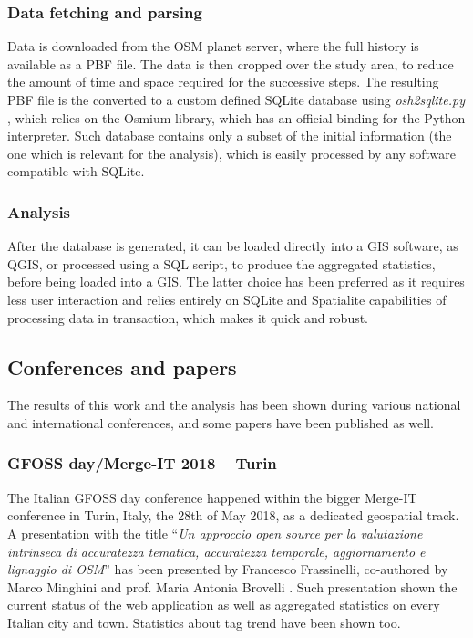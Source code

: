 \documentclass{Configuration_Files/PoliMi3i_thesis}
\begin{document}
\subsubsection{Data fetching and parsing}

Data is downloaded from the OSM planet server, where the full history is available as a PBF file. The data is then cropped over the study area, to reduce the amount of time and space required for the successive steps. The resulting PBF file is the converted to a custom defined SQLite database using \textit{osh2sqlite.py} \cite{262588213843476OSMNodeHistory}, which relies on the Osmium library, which has an official binding for the Python interpreter. Such database contains only a subset of the initial information (the one which is relevant for the analysis), which is easily processed by any software compatible with SQLite.

\subsubsection{Analysis}

After the database is generated, it can be loaded directly into a GIS software, as QGIS, or processed using a SQL script, to produce the aggregated statistics, before being loaded into a GIS. The latter choice has been preferred \cite{262588213843476ProcessingDatabasesGenerated}as it requires less user interaction and relies entirely on SQLite and Spatialite capabilities of processing data in transaction, which makes it quick and robust.

\subsection{Conferences and papers}

The results of this work and the analysis has been shown during various national and international conferences, and some papers have been published as well.

\subsubsection{GFOSS day/Merge-IT 2018 – Turin}

The Italian GFOSS day conference happened within the bigger Merge-IT conference in Turin, Italy, the 28th of May 2018, as a dedicated geospatial track.
A presentation with the title “\textit{Un approccio open source per la valutazione intrinseca di accuratezza tematica, accuratezza temporale, aggiornamento e lignaggio di OSM}” has been presented by Francesco Frassinelli, co-authored by Marco Minghini and prof. Maria Antonia Brovelli \cite{frassinelliApproccioOpenSource2018}.
Such presentation shown the current status of the web application as well as aggregated statistics on every Italian city and town. Statistics about tag trend have been shown too.
\end{document}
